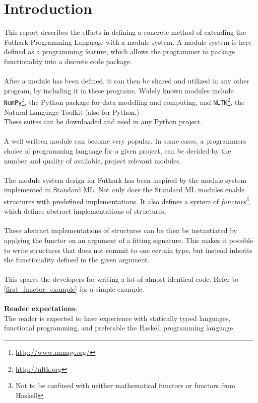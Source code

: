 \section{Introduction}
\label{sec:introduction}
This report describes the efforts in defining a concrete method of extending the Futhark Programming Language with a module system.
A module system is here defined as a programming feature,
which allows the programmer to package functionality into a discrete code
package.
\\\\
After a module has been defined, it can then be shared and utilized in any other
program, by including it in these programs. Widely known modules include
\texttt{NumPy}\footnote{\url{http://www.numpy.org/}}, the Python package for
data modelling and computing, and \texttt{NLTK}\footnote{\url{http://nltk.org}},
the Natural Language Toolkit (also for Python.)
\\
These suites can be downloaded and used in any Python project.
\\
\\
A well written module can become very popular. In some cases, a programmers
choice of programming language for a given project, can be decided by the number and quality of
available, project relevant modules.
\\
\\
The module system design for Futhark has been inspired by the module system
implemented in Standard ML\cite{crash_course}. Not only does the Standard ML
modules enable structures with predefined implementations.
It also defines a system of \textit{functors\footnote{Not to be confused with neither mathematical
  functors or functors from Haskell}}, which defines abstract implementations of
structures.
\\
\\
These abstract implementations of structures can be then be instantiated by
applying the functor on an argument of a fitting signature.
This makes it
possible to write structures that does not commit to one certain type, but
instead inherits the functionality defined in the given argument.
\\
\\
This spares the developers for writing a lot of almost identical code. Refer to
\ref{first_functor_example} for a simple example.
\\
\\
\textbf{Reader expectations}:\\
The reader is expected to have experience with statically typed languages,
functional programming, and preferable the Haskell programming language.
\pagebreak
